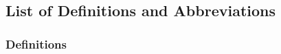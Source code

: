 \documentclass[english]{article}
\begin{document}
%

\newpage
\subsection{List of Definitions and Abbreviations}

\subsubsection{Definitions}
\end{document}
